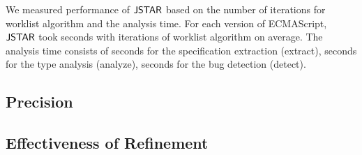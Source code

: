 We measured performance of $\tool$ based on the number of iterations for
worklist algorithm and the analysis time.  For each version of ECMAScript,
$\tool$ took  seconds with  iterations of worklist
algorithm on average.  The analysis time consists of  seconds for
the specification extraction (\textsf{extract}),  seconds for the
type analysis (\textsf{analyze}),  seconds for the bug detection
(\textsf{detect}).


\subsection{Precision}

\begin{table}
  \centering
  \caption{The creaters and resolvers of true bugs.}
  \label{fig:author}
\end{table}


\subsection{Effectiveness of Refinement}

